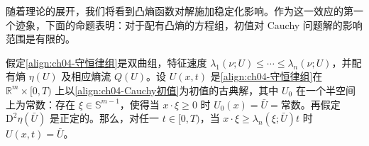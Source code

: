﻿\documentclass[../../main.tex]{subfiles}
\begin{document}
随着理论的展开，我们将看到凸熵函数对解施加稳定化影响。作为这一效应的第一个迹象，下面的命题表明：对于配有凸熵的方程组，初值对 Cauchy 问题解的影响范围是有限的。

\begin{theorem}[有限影响区域]\label{theorem:ch04-影响区域}
假定\eqref{align:ch04-守恒律组}是双曲组，特征速度 $\lambda_{1}(\nu;U)\leqslant\cdots\leqslant\lambda_{n}(\nu;U)$，并配有熵 $\eta(U)$ 及相应熵流 $Q(U)$。设 $U(x,t)$ 是\eqref{align:ch04-守恒律组}在 $\mathbb{R}^{m}\times[0,T)$ 上以\eqref{align:ch04-Cauchy初值}为初值的古典解，其中 $U_{0}$ 在一个半空间上为常数：存在 $\xi\in\mathbb{S}^{m-1}$，使得当 $x\cdot\xi\geqslant 0$ 时 $U_{0}(x)=\bar{U}=\text{常数}$。再假定 $\mathrm{D}^{2}\eta(\bar{U})$ 是正定的。那么，对任一 $t\in[0,T)$，当 $x\cdot\xi\geqslant\lambda_{n}(\xi;\bar{U})t$ 时 $U(x,t)=\bar{U}$。
\end{theorem}
\end{document}
